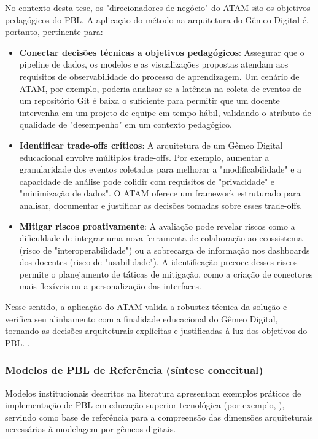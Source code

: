 \documentclass[12pt,a4paper]{article}
\begin{document}
No contexto desta tese, os "direcionadores de negócio" do ATAM são os objetivos pedagógicos do PBL. A aplicação do método na arquitetura do Gêmeo Digital é, portanto, pertinente para:
\begin{itemize}
    \item \textbf{Conectar decisões técnicas a objetivos pedagógicos}: Assegurar que o pipeline de dados, os modelos e as visualizações propostas atendam aos requisitos de observabilidade do processo de aprendizagem. Um cenário de ATAM, por exemplo, poderia analisar se a latência na coleta de eventos de um repositório Git é baixa o suficiente para permitir que um docente intervenha em um projeto de equipe em tempo hábil, validando o atributo de qualidade de "desempenho" em um contexto pedagógico.
    \item \textbf{Identificar trade-offs críticos}: A arquitetura de um Gêmeo Digital educacional envolve múltiplos trade-offs. Por exemplo, aumentar a granularidade dos eventos coletados para melhorar a "modificabilidade" e a capacidade de análise pode colidir com requisitos de "privacidade" e "minimização de dados". O ATAM oferece um framework estruturado para analisar, documentar e justificar as decisões tomadas sobre esses trade-offs.
    \item \textbf{Mitigar riscos proativamente}: A avaliação pode revelar riscos como a dificuldade de integrar uma nova ferramenta de colaboração ao ecossistema (risco de "interoperabilidade") ou a sobrecarga de informação nos dashboards dos docentes (risco de "usabilidade"). A identificação precoce desses riscos permite o planejamento de táticas de mitigação, como a criação de conectores mais flexíveis ou a personalização das interfaces.
\end{itemize}

Nesse sentido, a aplicação do ATAM valida a robustez técnica da solução e verifica seu alinhamento com a finalidade educacional do Gêmeo Digital, tornando as decisões arquiteturais explícitas e justificadas à luz dos objetivos do PBL.
.


\subsubsection{Modelos de PBL de Referência (síntese conceitual)}

Modelos institucionais descritos na literatura apresentam exemplos práticos de
implementação de PBL em educação superior tecnológica (por exemplo, \cite{inteli_ppc_2024}),
servindo como base de referência para a compreensão das dimensões
arquiteturais necessárias à modelagem por gêmeos digitais.
\end{document}

